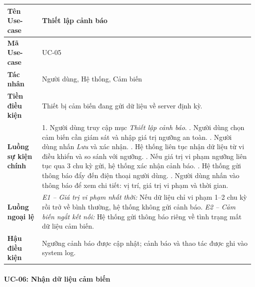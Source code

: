 \begin{table}[H]
\centering
\renewcommand{\arraystretch}{1.4}
\begin{tabular}{|p{3.8cm}|p{10cm}|}
\hline
\textbf{Tên Use-case}       & Thiết lập cảnh báo \\ \hline
\textbf{Mã Use-case}        & UC-05 \\ \hline
\textbf{Tác nhân}           & Người dùng, Hệ thống, Cảm biến \\ \hline
\textbf{Tiền điều kiện}     & Thiết bị cảm biến đang gửi dữ liệu về server định kỳ. \\ \hline
\textbf{Luồng sự kiện chính} & 
1. Người dùng truy cập mục \textit{Thiết lập cảnh báo}. \newline
2. Người dùng chọn cảm biến cần giám sát và nhập giá trị ngưỡng an toàn. \newline
3. Người dùng nhấn \textit{Lưu} và xác nhận. \newline
4. Hệ thống liên tục nhận dữ liệu từ vi điều khiển và so sánh với ngưỡng. \newline
5. Nếu giá trị vi phạm ngưỡng liên tục qua 3 chu kỳ gửi, hệ thống xác nhận cảnh báo. \newline
6. Hệ thống gửi thông báo đẩy đến điện thoại người dùng. \newline
7. Người dùng nhấn vào thông báo để xem chi tiết: vị trí, giá trị vi phạm và thời gian. \\ \hline
\textbf{Luồng ngoại lệ}     & 
\textit{E1 -- Giá trị vi phạm nhất thời:} Nếu dữ liệu chỉ vi phạm 1--2 chu kỳ rồi trở về bình thường, hệ thống không gửi cảnh báo. \newline
\textit{E2 -- Cảm biến ngắt kết nối:} Hệ thống gửi thông báo riêng về tình trạng mất dữ liệu cảm biến. \\ \hline
\textbf{Hậu điều kiện}      & Ngưỡng cảnh báo được cập nhật; cảnh báo và thao tác được ghi vào system log. \\ \hline
\end{tabular}
\end{table}

\paragraph{UC-06: Nhận dữ liệu cảm biến}

